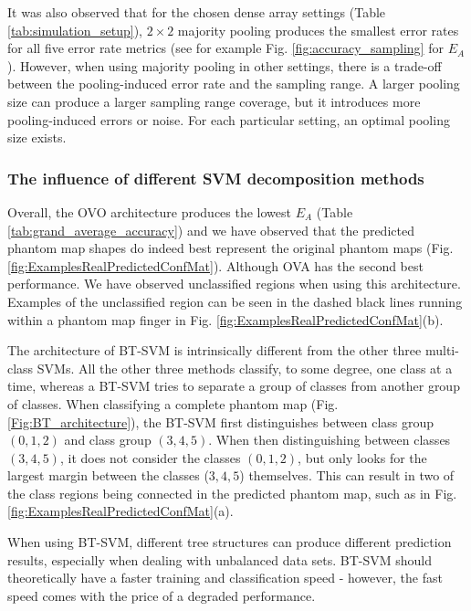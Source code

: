 It was also observed that for the chosen dense array settings (Table \ref{tab:simulation_setup}), $2 \times 2$ majority pooling produces the smallest error rates for all five error rate metrics (see for example Fig. \ref{fig:accuracy_sampling} for $E_A$). However, when using majority pooling in other settings, there is a trade-off between the pooling-induced error rate and the sampling range. A larger pooling size can produce a larger sampling range coverage, but it introduces more pooling-induced errors or noise. For each particular setting, an optimal pooling size exists.



\subsubsection{The influence of different SVM decomposition methods}
Overall, the OVO architecture produces the lowest $E_A$ (Table \ref{tab:grand_average_accuracy}) and we have observed that the predicted phantom map shapes do indeed best represent the original phantom maps (Fig. \ref{fig:ExamplesRealPredictedConfMat}). Although OVA has the second best performance. We have observed unclassified regions when using this architecture. Examples of the unclassified region can be seen in the dashed black lines running within a phantom map finger in Fig. \ref{fig:ExamplesRealPredictedConfMat}(b).

The architecture of BT-SVM is intrinsically different from the other three multi-class SVMs. All the other three methods classify, to some degree, one class at a time, whereas a BT-SVM tries to separate a group of classes from another group of classes. 
When classifying a complete phantom map (Fig. \ref{Fig:BT_architecture}), the BT-SVM first distinguishes between class group $(0,1,2)$ and class group $(3,4,5)$. When then distinguishing between classes $(3, 4, 5)$, it does not consider the classes $(0,1,2)$, but only looks for the largest margin between the classes ($3,4,5$) themselves. This can result in two of the class regions being connected in the predicted phantom map, such as in Fig. \ref{fig:ExamplesRealPredictedConfMat}(a).

When using BT-SVM, different tree structures can produce different prediction results, especially when dealing with unbalanced data sets.
BT-SVM should theoretically have a faster training and classification speed - however, the fast speed comes with the price of a degraded performance\cite{cheong2004support}.


